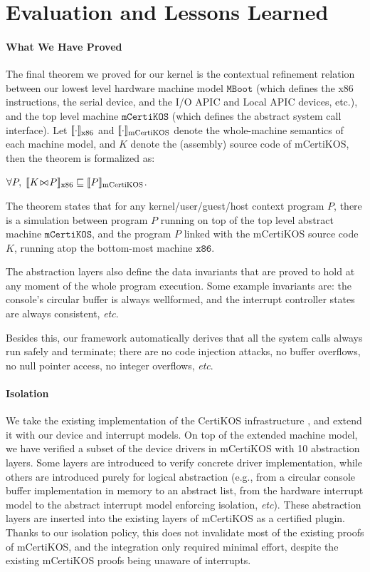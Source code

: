 \section{Evaluation and Lessons Learned}
\label{sec:lessons}

\paragraph{What We Have Proved}
The final theorem we proved for our kernel is the contextual refinement
relation between
our lowest level hardware machine model $\texttt{MBoot}$ (which defines
the x86 instructions, the serial device, and the I/O APIC and Local APIC
devices, etc.), and the top level machine $\texttt{mCertiKOS}$ (which
defines the abstract system call interface).  Let
$\sem{\rm{}x86}{\cdot}$ and $\sem{\rm{}mCertiKOS}{\cdot}$ denote the
whole-machine semantics of each machine model, and $K$ denote the
(assembly) source code of mCertiKOS, then the theorem is formalized
as:

\begin{theorem}
 $\forall P,\;\sem{\rm{}x86}{K\join{}P}\Refrel{}\sem{\rm{}mCertiKOS}{P}$.
\end{theorem}

The theorem states that for any kernel/user/guest/host
context program $P$, there is a simulation between program $P$ running
on top of the top level abstract machine $\texttt{mCertiKOS}$, and the
program $P$ linked with the mCertiKOS source code $K$, running
atop the bottom-most machine $\texttt{x86}$.

The abstraction layers also define the data invariants that are proved
to hold at any moment of the whole program execution. Some example
invariants are: the console's circular buffer is always well\-formed,
and the interrupt controller states are always consistent, {\it etc}.

Besides this, our framework automatically derives that all the system
calls always run safely and terminate; there are no code injection
attacks, no buffer overflows, no null pointer access, no integer
overflows, {\it etc}.

\paragraph{Isolation}
We take the existing implementation of the CertiKOS infrastructure
\cite{dscal15}, and extend it with our device and interrupt models.
On top of the extended machine model, we have verified a subset of the
device drivers in mCertiKOS with 10 abstraction layers. Some layers
are introduced to verify concrete driver implementation, while others
are introduced purely for logical abstraction (e.g., from a circular
console buffer implementation in memory to an abstract list, from the
hardware interrupt model to the abstract interrupt model enforcing
isolation, {\it etc}).  These abstraction layers are inserted into the
existing layers of mCertiKOS as a certified plugin.  Thanks to our
isolation policy, this does not invalidate most of the existing proofs
of mCertiKOS, and the integration only required minimal effort, despite
the existing mCertiKOS proofs being unaware of interrupts.


